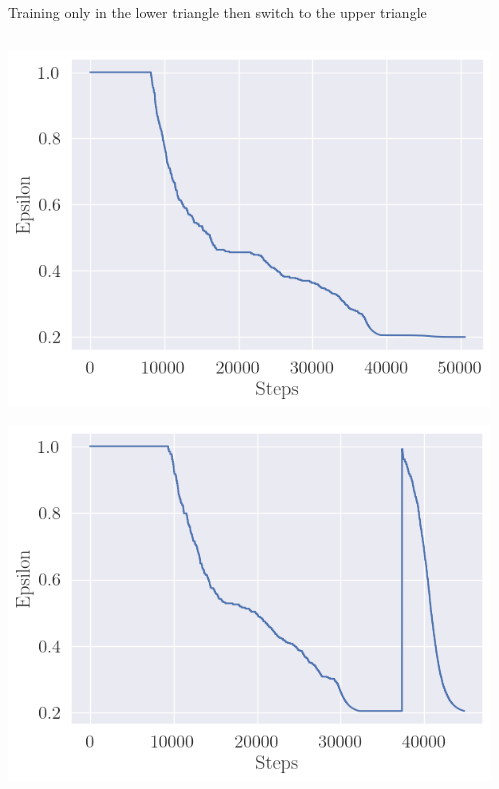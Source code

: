 \documentclass[bigger]{beamer}
\begin{document}
\begin{frame}[label={sec:org5306e95}]{Training only in the lower triangle then switch to the upper triangle}
\begin{columns}
\begin{column}{0.5\columnwidth}
\begin{center}
\includegraphics[height=0.4\textheight]{img/exploration-rate_upper-then-lower1.png}
\end{center}
\begin{center}
\includegraphics[height=0.4\textheight]{img/exploration-rate_upper-then-lower2.png}
\end{center}
\end{column}
\begin{column}{0.5\columnwidth}

\end{column}
\end{columns}
\end{frame}
\end{document}
